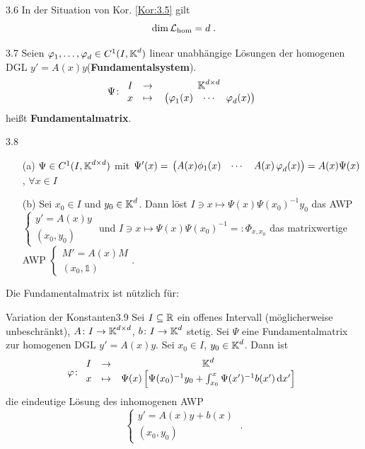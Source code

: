 \documentclass[a4paper]{article}
\begin{document}
\begin{Kor}{}{3.6}
In der Situation von Kor. \ref{Kor:3.5} gilt
\[\dim \operatorname{\mathcal{L}}_{\text{hom}}=d\;.\]
\end{Kor}

\begin{Def}{}{3.7}
Seien $\operatorname{\varphi}_1,\ldots,\operatorname{\varphi}_d\in C^1(I,\operatorname{\mathbb K}^d)$ linear unabhängige Lösungen der homogenen DGL $y'=A(x)y$(\textbf{Fundamentalsystem}). 
\[\Psi\colon \begin{array}{clc}
I&\to&\operatorname{\mathbb K}^{d\times d}\\
x&\mapsto&\mathop{}\begin{pmatrix}\operatorname{\varphi}_1(x)&\cdots&\operatorname{\varphi}_d(x)\end{pmatrix}
\end{array}
\]
heißt \textbf{Fundamentalmatrix}.
\end{Def}

\begin{Bemerkung}{}{3.8}
\begin{itemize}
    \item[(a)] $\Psi\in C^1(I,\operatorname{\mathbb K}^{d\times d})$ mit $\Psi'(x)=\mathop{}\begin{pmatrix}A(x)\phi_1(x)&\cdots&A(x)\operatorname{\varphi}_d(x)\end{pmatrix}=A(x)\Psi(x)$, $\forall x\in I$
    \item[(b)] Sei $x_0\in I$ und $y_0\in\operatorname{\mathbb K}^d$. Dann löst 
    $I\ni x\mapsto \Psi(x)\Psi(x_0)^{-1}y_0$ das AWP
    $\left\{\begin{array}{c}
         y'=A(x)y\\ (x_0,y_0)
    \end{array}\right.$
    und $I\ni x\mapsto \Psi(x)\Psi(x_0)^{-1}=:\Phi_{x,x_0}$ das matrixwertige AWP
    $\left\{\begin{array}{c}
         M'=A(x)M\\
         (x_0,\mathds1)
    \end{array}\right.$.
\end{itemize}
\end{Bemerkung}

Die Fundamentalmatrix ist nützlich für:

\begin{Satz}{Variation der Konstanten}{3.9}
Sei $I\subseteq \mathbb R$ ein offenes Intervall (möglicherweise unbeschränkt), $A\colon I\to \operatorname{\mathbb K}^{d\times d}$, $b\colon I\to\operatorname{\mathbb K}^d$ stetig. Sei $\Psi$ eine Fundamentalmatrix zur homogenen DGL $y'=A(x)y$. Sei $x_0\in I$, $y_0\in \operatorname{\mathbb K}^d$. Dann ist
\[\operatorname{\varphi}\colon\begin{array}{clc}
 I&\to&\operatorname{\mathbb K}^d\\
x&\mapsto& \Psi(x)\left[\Psi(x_0)^{-1}y_0+\int_{x_0}^x\Psi(x')^{-1}b(x')\mathop{}\!\mathrm{d} x'\right]
\end{array}\]
die eindeutige Lösung des inhomogenen AWP
\[\left\{\begin{array}{c}
         y'=A(x)y+b(x)\\
         (x_0,y_0)
    \end{array}\right.\;.\]
\end{Satz}
\end{document}
